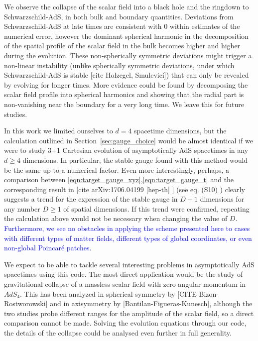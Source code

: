 \documentclass[a4paper,11pt]{article}
\begin{document}
We observe the collapse of the scalar field into a black hole and the ringdown to Schwarzschild-AdS, in both bulk and boundary quantities.
Deviations from Schwarzschild-AdS at late times are consistent with 0 within estimates of the numerical error, however the dominant spherical harmonic in the decomposition of the spatial profile of the scalar field in the bulk becomes higher and higher during the evolution. These non-spherically symmetric deviations might trigger a non-linear instability (unlike spherically symmetric deviations, under which Schwarzschild-AdS is stable [cite Holzegel, Smulevici]) that can only be revealed by evolving for longer times. More evidence could be found by decomposing the scalar field profile into spherical harmonics and showing that the radial part is non-vanishing near the boundary for a very long time. We leave this for future studies.

In this work we limited ourselves to $d=4$ spacetime dimensions, but the calculation outlined in Section~\ref{sec:gauge_choice} would be almost identical if we were to study 3+1 Cartesian evolution of asymptotically AdS spacetimes in any $d\geq4$ dimensions. In particular, the stable gauge found with this method would be the same up to a numerical factor. Even more interestingly, perhaps, a comparison between \eqref{eqn:target_gauge_xyz},\eqref{eqn:target_gauge_t} and the corresponding result in [cite arXiv:1706.04199 [hep-th] ] (see eq. (S10) ) clearly suggests a trend for the expression of the stable gauge in $D+1$ dimensions for any number $D\geq1$ of spatial dimensions. If this trend were confirmed, repeating the calculation above would not be necessary when changing the value of $D$. \textcolor{blue}{Furthermore, we see no obstacles in applying the scheme presented here to cases with different types of matter fields, different types of global coordinates, or even non-global Poincar\'{e} patches.}

We expect to be able to tackle several interesting problems in asymptotically AdS spacetimes using this code. The most direct application would be the study of gravitational collapse of a massless scalar field with zero angular momentum in $AdS_4$. This has been analyzed in spherical symmetry by [CITE Bizon-Rostworowski] and in axisymmetry by [Bantilan-Figueras-Kunesch], although the two studies probe different ranges for the amplitude of the scalar field, so a direct comparison cannot be made. Solving the evolution equations through our code, the details of the collapse could be analysed even further in full generality.
\end{document}
